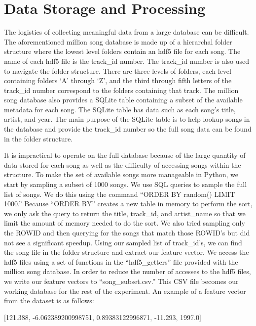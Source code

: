 \documentclass{amsart}
\theoremstyle{plain}
\theoremstyle{definition}
\begin{document}
  	\section{Data Storage and Processing}
  	
  	The logistics of collecting meaningful data from a large database can be difficult.  The aforementioned million song database is made up of a hierarchal folder structure where the lowest level folders contain an hdf5 file for each song.  The name of each hdf5 file is the track\_id number.  The track\_id number is also used to navigate the folder structure.  There are three levels of folders, each level containing folders ‘A’ through ‘Z’, and the third through fifth letters of the track\_id number correspond to the folders containing that track.  The million song database also provides a SQLite table containing a subset of the available metadata for each song.  The SQLite table has data such as each song’s title, artist, and year.  The main purpose of the SQLite table is to help lookup songs in the database and provide the track\_id number so the full song data can be found in the folder structure.
  	
  	It is impractical to operate on the full database because of the large quantity of data stored for each song as well as the difficulty of accessing songs within the structure.  To make the set of available songs more manageable in Python, we start by sampling a subset of 1000 songs.  We use SQL queries to sample the full list of songs.  We do this using the command “ORDER BY random() LIMIT 1000.”  Because “ORDER BY” creates a new table in memory to perform the sort, we only ask the query to return the title, track\_id, and artist\_name so that we limit the amount of memory needed to do the sort. We also tried sampling only the ROWID and then querying for the songs that match those ROWID’s but did not see a significant speedup.   Using our sampled list of track\_id’s, we can find the song file in the folder structure and extract our feature vector.  We access the hdf5 files using a set of functions in the “hdf5\_getters” file provided with the million song database.  In order to reduce the number of accesses to the hdf5 files, we write our feature vectors to “song\_subset.csv.” This CSV file becomes our working database for the rest of the experiment. An example of a feature vector from the dataset is as follows: \\
  	
  	\begin{center}
  		[121.388, -6.062389200998751, 0.89383122996871, -11.293, 1997.0]
  	\end{center} \
  
\end{document}
